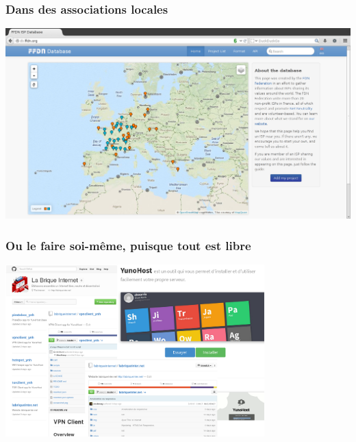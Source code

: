 \documentclass[notes=hide]{beamer}
\begin{document}
\begin{frame}[t]
\frametitle{\textcolor{titre}{Dans des associations locales}}
\begin{center}
\vfill
\includegraphics[width=\textwidth]{img2/25a-capture-ffdn.png}
\vfill
\end{center}
\end{frame}

\begin{frame}[t]
\frametitle{\textcolor{titre}{Ou le faire soi-même, puisque tout est libre}}
\begin{center}
\vfill
\includegraphics[width=10cm]{img2/25b-capture-github-contrib.pdf}
\vfill
\end{center}
\end{frame}
\end{document}
